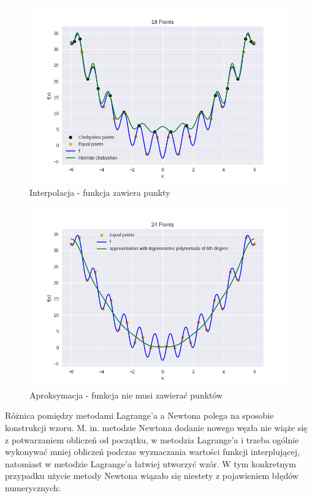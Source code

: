 \documentclass{article}
\begin{document}
\begin{figure}[H]
    \centering
    \includegraphics[width=\textwidth]{img/herm_18.png}
    \caption{Interpolacja - funkcja zawiera punkty}
\end{figure}

\begin{figure}[H]
    \centering
    \includegraphics[width=\textwidth]{img/tripoly_6_24.png}
    \caption{Aproksymacja - funkcja nie musi zawierać punktów}
\end{figure}

Różnica pomiędzy metodami Lagrange'a a Newtona polega na sposobie konstrukcji wzoru. M. in. metodzie Newtona dodanie nowego
węzła nie wiąże się z potwarzaniem obliczeń od początku, w metodzia Lagrange'a i trzeba ogólnie wykonywać mniej obliczeń podczas
wyznaczania wartości funkcji interplującej, natomiast w metodzie Lagrange'a łatwiej utworzyć wzór. W tym konkretnym przypadku
użycie metody Newtona wiązało się niestety z pojawieniem błędów numerycznych:
\end{document}
